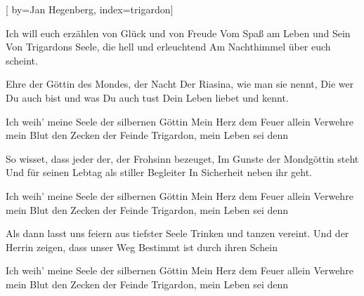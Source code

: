 
[%
    by={Jan Hegenberg},
    index={trigardon}]



    \label{trigardon}

    \beginverse
        Ich will euch erz\"{a}hlen von Gl\"{u}ck und von Freude
        Vom Spa\ss{} am Leben und Sein
        Von Trigardons Seele, die hell und erleuchtend
        Am Nachthimmel \"{u}ber euch scheint. 
    \endverse

    \beginverse
        Ehre der G\"{o}ttin des Mondes, der Nacht
        Der Riasina, wie man sie nennt,
        Die wer Du auch bist und was Du auch tust
        Dein Leben liebet und kennt. 
    \endverse

    \beginchorus
        Ich weih' meine Seele der silbernen G\"{o}ttin
        Mein Herz dem Feuer allein
        Verwehre mein Blut den Zecken der Feinde
        Trigardon, mein Leben sei denn 
    \endchorus

    \beginverse
        So wisset, dass jeder der, der Frohsinn bezeuget,
        Im Gunste der Mondg\"{o}ttin steht
        Und f\"{u}r seinen Lebtag als stiller Begleiter
        In Sicherheit neben ihr geht. 
    \endverse

    \beginchorus
        Ich weih' meine Seele der silbernen G\"{o}ttin
        Mein Herz dem Feuer allein
        Verwehre mein Blut den Zecken der Feinde
        Trigardon, mein Leben sei denn 
    \endchorus

    \beginverse
        Als dann lasst uns feiern aus tiefster Seele
        Trinken und tanzen vereint.
        Und der Herrin zeigen, dass unser Weg
        Bestimmt ist durch ihren Schein 
    \endverse

    \beginchorus
        \lrep Ich weih' meine Seele der silbernen G\"{o}ttin
        Mein Herz dem Feuer allein
        Verwehre mein Blut den Zecken der Feinde
        Trigardon, mein Leben sei denn  \rrep {}
    \endchorus
\endsong
